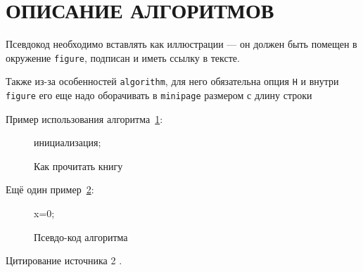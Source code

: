 \section{ОПИСАНИЕ АЛГОРИТМОВ}

Псевдокод необходимо вставлять как иллюстрации --- он должен быть помещен в окружение \texttt{figure}, подписан и иметь ссылку в тексте.

Также из-за особенностей \texttt{algorithm}, для него обязательна опция \texttt{H} и внутри \texttt{figure} его еще надо оборачивать в \texttt{minipage} размером с длину строки

Пример использования алгоритма~\ref{alg:alg1}:

\begin{figure}
\begin{minipage}{\linewidth}
\begin{algorithm}[H]  
    \SetAlgoVlined
    инициализация;
\end{algorithm}
\end{minipage}
\caption{Как прочитать книгу}
\label{alg:alg1}
\end{figure}

\lipsum[1][1]

\pagebreak

Ещё один пример~\ref{alg:generalGP}:

\begin{figure}
\begin{minipage}{\linewidth}
\begin{algorithm}[H]
	\SetAlgoVlined %
	
	x=0;
	\While{ $\tau_{norm} > \varepsilon_{tol}$ }{
		$s_{k-1} \leftarrow x_k - x_{k-1}$;
		\tcc*[l]{Step lenght computation:} %
		\eIf{$k$ is even}{
			$ \alpha_k^{ABB} = \frac{ s_{k-1}^T y_{k-1}}{y_{k-1}^T y_{k-1}}$
		}{ %
		$\alpha_k^{ABB} = \frac{ s_{k-1}^T s_{k-1}}{s_{k-1}^T y_{k-1}}$
	} %
	$k \leftarrow k + 1$;
	\For{ i = 1}{
		$x_{i+1} = P_\Omega(x_i - \alpha_k^{ABB}*g_k)$;
	} %
	\tcc*[l]{Compute the termination constant} %
	$\tau_{norm} = abs ( ||x_{k}||_2 - ||x_{k-1}||_2)$
} %
\end{algorithm}
\end{minipage}
\caption{Псевдо-код алгоритма}
\label{alg:generalGP}
\end{figure}

Цитирование источника 2 \cite{cite_1_10}.
